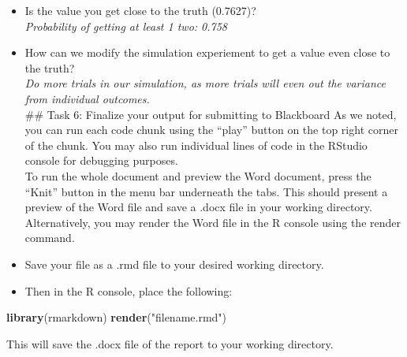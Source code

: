 \documentclass[
]{article}
\newenvironment{Shaded}{\begin{snugshade}}{\end{snugshade}}
\newcommand{\KeywordTok}[1]{\textcolor[rgb]{0.13,0.29,0.53}{\textbf{#1}}}
\newcommand{\NormalTok}[1]{#1}
\newcommand{\StringTok}[1]{\textcolor[rgb]{0.31,0.60,0.02}{#1}}
\providecommand{\tightlist}{%
  \setlength{\itemsep}{0pt}\setlength{\parskip}{0pt}}
\begin{document}
\begin{itemize}
\tightlist
\item
  Is the value you get close to the truth (0.7627)?\\
  \emph{Probability of getting at least 1 two: 0.758}\\
\item
  How can we modify the simulation experiement to get a value even close
  to the truth?\\
  \emph{Do more trials in our simulation, as more trials will even out
  the variance from individual outcomes.}\\
  \#\# Task 6: Finalize your output for submitting to Blackboard As we
  noted, you can run each code chunk using the ``play'' button on the
  top right corner of the chunk. You may also run individual lines of
  code in the RStudio console for debugging purposes.\\
  To run the whole document and preview the Word document, press the
  ``Knit'' button in the menu bar underneath the tabs. This should
  present a preview of the Word file and save a .docx file in your
  working directory.\\
  Alternatively, you may render the Word file in the R console using the
  render command.
\item
  Save your file as a .rmd file to your desired working directory.
\item
  Then in the R console, place the following:
\end{itemize}

\begin{Shaded}
\begin{Highlighting}[]
\KeywordTok{library}\NormalTok{(rmarkdown)}
\KeywordTok{render}\NormalTok{(}\StringTok{"filename.rmd"}\NormalTok{)}
\end{Highlighting}
\end{Shaded}

This will save the .docx file of the report to your working directory.
\end{document}

